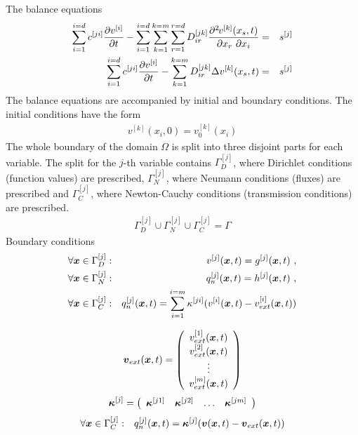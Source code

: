The balance equations 
\begin{eqnarray}
\sum_{i=1}^{i=d} c^{[ji]} \mbox{$\displaystyle\frac{\partial{v^{[i]}}}{\partial{t}}$} - \sum_{i=1}^{i=d} \sum_{k=1}^{k=m} \sum_{r=1}^{r=d} D^{[jk]}_{ir} \mbox{$\displaystyle\frac{\partial^{2}\>\!\!{v^{[k]}(x_s,t)}}{\partial{x_r}\ \partial{x_i}}$} &=& s^{[j]}
\\
\sum_{i=1}^{i=d} c^{[ji]} \mbox{$\displaystyle\frac{\partial{v^{[i]}}}{\partial{t}}$} - \sum_{k=1}^{k=m} D^{[jk]}_{ir} \Delta v^{[k]}(x_s,t) &=& s^{[j]}
\end{eqnarray}
The balance equations are accompanied by initial and boundary conditions. The initial conditions have the form
\begin{eqnarray}
v^{[k]}(x_i,0) = v^{[k]}_0(x_i)
\end{eqnarray}
The whole boundary of the domain $\Omega$ is split into three disjoint parts for each variable.
The split for the $j$-th variable contains $\Gamma^{[j]}_D$, where Dirichlet conditions (function
values) are prescribed, $\Gamma^{[j]}_N$, where Neumann conditions (fluxes) are prescribed and 
$\Gamma^{[j]}_C$, where Newton-Cauchy conditions (transmission conditions) are prescribed.
\begin{eqnarray}\label{eqboundarydecomp}
\Gamma^{[j]}_D \cup \Gamma^{[j]}_N \cup \Gamma^{[j]}_C = \Gamma
\end{eqnarray}
Boundary conditions
\begin{eqnarray}\label{eqdirichletbc}
\forall \mbox{\boldmath$x$} \in \Gamma^{[j]}_D &:& v^{[j]}(\mbox{\boldmath$x$},t) = g^{[j]}(\mbox{\boldmath$x$},t)\ ,
\\ \label{eqneumannbc}
\forall \mbox{\boldmath$x$} \in \Gamma^{[j]}_N &:& q^{[j]}_n(\mbox{\boldmath$x$},t) = h^{[j]}(\mbox{\boldmath$x$},t)\ ,
\\ \label{eqnewtonbc}
\forall \mbox{\boldmath$x$} \in \Gamma^{[j]}_C &:& q^{[j]}_n(\mbox{\boldmath$x$},t) = \sum_{i=1}^{i=m} \kappa^{[ji]} (v^{[i]}(\mbox{\boldmath$x$},t) - v^{[i]}_{ext}(\mbox{\boldmath$x$},t))
\end{eqnarray}

\begin{eqnarray}
\mbox{\boldmath$v$}_{ext}(\mbox{\boldmath$x$},t) = \left(\begin{array}{c}
v^{[1]}_{ext}(\mbox{\boldmath$x$},t)
\\
v^{[2]}_{ext}(\mbox{\boldmath$x$},t)
\\
\vdots
\\
v^{[m]}_{ext}(\mbox{\boldmath$x$},t)
\end{array}\right)
\end{eqnarray}
\begin{eqnarray}
\mbox{\boldmath$\kappa$}^{[j]} = \left(\begin{array}{cccc}
\mbox{\boldmath$\kappa$}^{[j1]} & \mbox{\boldmath$\kappa$}^{[j2]} & \ldots & \mbox{\boldmath$\kappa$}^{[jm]}
\end{array}\right)
\end{eqnarray}
\begin{eqnarray}
\forall \mbox{\boldmath$x$} \in \Gamma^{[j]}_C &:& q^{[j]}_n(\mbox{\boldmath$x$},t) = \mbox{\boldmath$\kappa$}^{[j]} (\mbox{\boldmath$v$}(\mbox{\boldmath$x$},t) - \mbox{\boldmath$v$}_{ext}(\mbox{\boldmath$x$},t))
\end{eqnarray}


